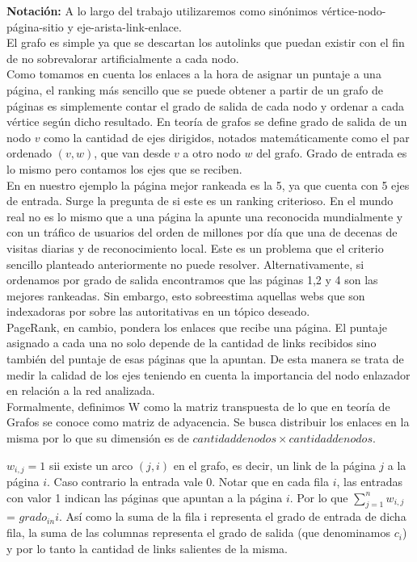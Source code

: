 \textbf{Notación: } A lo largo del trabajo utilizaremos como sinónimos vértice-nodo-página-sitio y eje-arista-link-enlace. \\

El grafo es simple ya que se descartan los autolinks que puedan existir con el fin de no sobrevalorar artificialmente a cada nodo.\\
Como tomamos en cuenta los enlaces a la hora de asignar un puntaje a una página, el ranking más sencillo que se puede obtener a partir de un grafo de páginas es simplemente contar el grado de salida de cada nodo y ordenar a cada vértice según dicho resultado. En teoría de grafos se define grado de salida de un nodo $v$ como la cantidad de ejes dirigidos, notados matemáticamente como el par ordenado $(v,w)$, que van desde $v$ a otro nodo $w$ del grafo. Grado de entrada es lo mismo pero contamos los ejes que se reciben. 
\\

En en nuestro ejemplo la página mejor rankeada es la 5, ya que cuenta con 5 ejes de entrada. Surge la pregunta de si este es un ranking criterioso. En el mundo real no es lo mismo que a una página la apunte una reconocida mundialmente y con un tráfico de usuarios del orden de millones por día que una de decenas de visitas diarias y de reconocimiento local. Este es un problema que el criterio sencillo planteado anteriormente no puede resolver.
Alternativamente, si ordenamos por grado de salida encontramos que las páginas 1,2 y 4 son las mejores rankeadas. Sin embargo, esto sobreestima aquellas webs que son indexadoras por sobre las autoritativas en un tópico deseado.\\

PageRank, en cambio, pondera los enlaces que recibe una página. El puntaje asignado a cada una no solo depende de la cantidad de links recibidos sino también del puntaje de esas páginas que la apuntan. De esta manera se trata de medir la calidad de los ejes teniendo en cuenta la importancia del nodo enlazador en relación a la red analizada.\\

Formalmente, definimos W como la matriz transpuesta de lo que en teoría de Grafos se conoce como matriz de adyacencia.
Se busca distribuir los enlaces en la misma por lo que su dimensión es de $cantidad de nodos \times cantidad de nodos$.

$w_{i,j} = 1$ sii existe un arco $(j,i)$ en el grafo, es decir, un link de la página $j$ a la página $i$. Caso contrario la entrada vale 0. Notar que en cada fila $i$, las entradas con valor 1 indican las páginas que apuntan a la página $i$. Por lo que $\sum_{j=1}^{n} w_{i,j}$ = $grado_{in} i$. Así como la suma de la fila i representa el grado de entrada de dicha fila, la suma de las columnas representa el grado de salida (que denominamos $c_{i}$) y por lo tanto la cantidad de links salientes de la misma. \\

